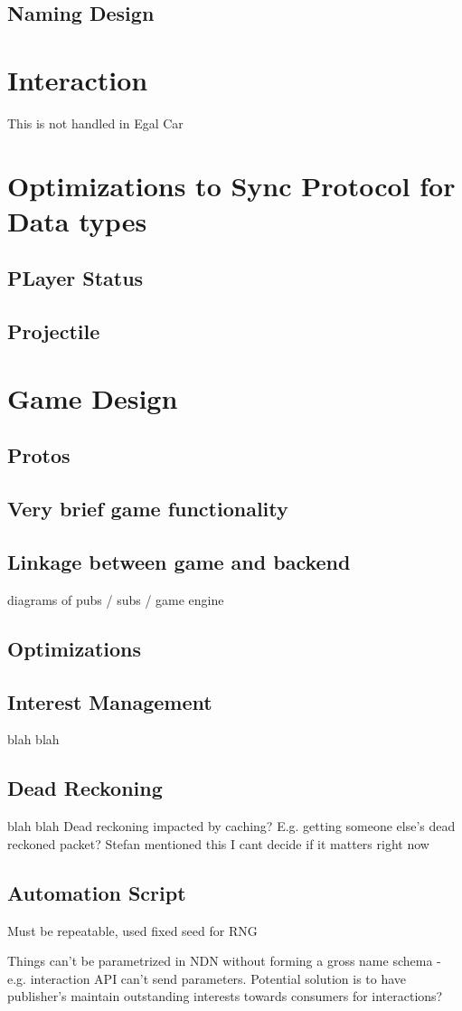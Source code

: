 \subsection{Naming Design}

\section{Interaction}
This is not handled in Egal Car

\section{Optimizations to Sync Protocol for Data types}
\subsection{PLayer Status}
\subsection{Projectile}

\section{Game Design}
\subsection{Protos}
\subsection{Very brief game functionality}
\subsection{Linkage between game and backend}
diagrams of pubs / subs / game engine
\subsection{Optimizations}
\subsection*{Interest Management}\label{sec:des:im}
blah blah 
\subsection*{Dead Reckoning}\label{sec:des:dr}
blah blah 
Dead reckoning impacted by caching? E.g. getting someone else's dead reckoned packet? Stefan mentioned this I cant decide if it matters right now

\subsection{Automation Script}
Must be repeatable, used fixed seed for RNG

Things can't be parametrized in NDN without forming a gross name schema - e.g. interaction API can't send parameters. Potential solution is to have publisher's maintain outstanding interests towards consumers for interactions?